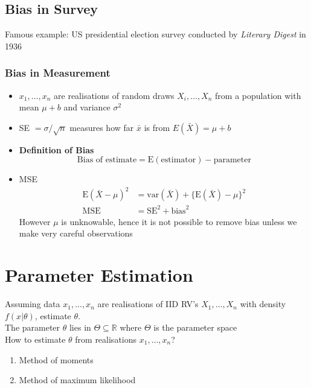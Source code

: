 \documentclass{article}
\begin{document}
\begin{multicols}{2}
\subsection{Bias in Survey}
Famous example: US presidential election survey conducted by \textit{Literary Digest} in 1936
\subsubsection{Bias in Measurement}
\begin{itemize}
	\item $x_1, \dots, x_n$ are realisations of random draws $X_i, \dots, X_n$ from a population with mean $\mu + b$ and variance $\sigma^2$
	\item SE $= \sigma/\sqrt{n}$ measures how far $\bar{x}$ is from $E(\bar{X}) = \mu + b$
	\item \textbf{Definition of Bias}
	$$\text{Bias of estimate} = \text{E}(\text{estimator}) - \text{parameter}$$
	\item MSE
	\begin{equation*}
		\begin{aligned}
			\text{E}(\bar{X}-\mu)^2 &= \text{var}(\bar{X}) + \{\text{E}(\bar{X}) - \mu\}^2\\
			\text{MSE} &= \text{SE}^2 + \text{bias}^2
		\end{aligned}
	\end{equation*}
However $\mu$ is unknowable, hence it is not possible to remove bias unless we make very careful observations
\end{itemize}

\section{Parameter Estimation}
Assuming data $x_1, \dots, x_n$ are realisations of IID RV's $X_1, \dots, X_n$ with density $f(x|\theta)$, estimate $\theta$.\\
The parameter $\theta$ lies in $\Theta \subseteq \mathbb{R}$ where $\Theta$ is the parameter space\\
How to estimate $\theta$ from realisations $x_1, \dots, x_n$?
\begin{enumerate}
	\item Method of moments
	\item Method of maximum likelihood
\end{enumerate}

\end{multicols}
\end{document}
